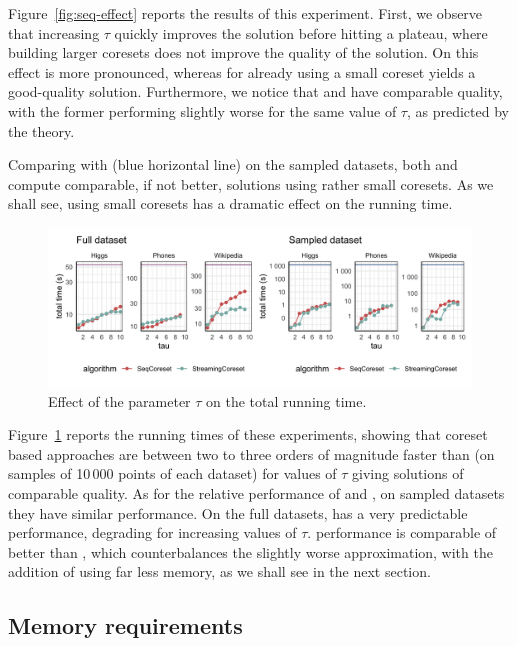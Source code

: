Figure~\ref{fig:seq-effect} reports the results of this experiment.
First, we observe that increasing $\tau$ quickly improves the solution before hitting a plateau, where
building larger coresets does not improve the quality of the solution.
On \higgs this effect is more pronounced, whereas for \wiki already using a small coreset yields a good-quality solution.
Furthermore, we notice that \stream and \seq have comparable quality, 
with the former performing slightly 
worse for the same value of $\tau$, as predicted by the theory.

Comparing with \chen (blue horizontal line) on the sampled datasets, both \seq and \stream compute comparable, 
if not better, solutions using rather small coresets.
As we shall see,
using small coresets has a dramatic effect on the running time.

\begin{figure}
    \includegraphics[width=\textwidth]{seq-time-50}
    \caption{
        \label{fig:seq-time}
        Effect of the parameter $\tau$ on the total running time.
    }
\end{figure}
Figure~\ref{fig:seq-time} reports the running times of these experiments,
showing that coreset based approaches are between two to three orders of magnitude faster than \chen
(on samples of 10\,000 points of each dataset) for values of $\tau$ giving solutions of comparable quality.
As for the relative performance of \seq and \stream, on sampled datasets they have similar performance.
On the full datasets, \seq has a very predictable performance, degrading for increasing values 
of $\tau$.
\stream performance is comparable of better than \seq, which counterbalances the slightly worse
approximation, with the addition of using far less memory, as we shall see in the next section.

\subsection{Memory requirements}
\label{sec:memory}

